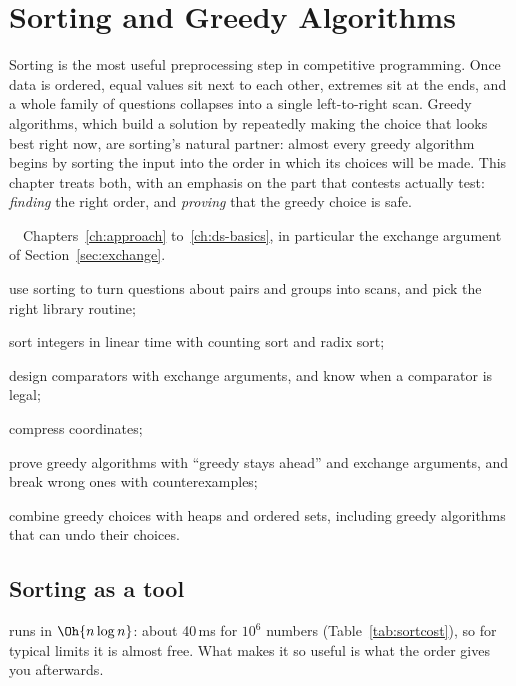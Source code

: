 \chapter{Sorting and Greedy Algorithms}\label{ch:sorting}

Sorting is the most useful preprocessing step in competitive programming. Once data is ordered, equal values sit next to
each other, extremes sit at the ends, and a whole family of questions collapses into a single left-to-right scan. Greedy
algorithms, which build a solution by repeatedly making the choice that looks best right now, are sorting's natural partner:
almost every greedy algorithm begins by sorting the input into the order in which its choices will be made. This chapter
treats both, with an emphasis on the part that contests actually test: \emph{finding} the right order, and \emph{proving}
that the greedy choice is safe.

\begin{chapterintro}{\bronze\ \silver\ \gold}{Chapters~\ref{ch:approach} to~\ref{ch:ds-basics}, in particular the exchange
argument of Section~\ref{sec:exchange}.}
  \item use sorting to turn questions about pairs and groups into scans, and pick the right library routine;
  \item sort integers in linear time with counting sort and radix sort;
  \item design comparators with exchange arguments, and know when a comparator is legal;
  \item compress coordinates;
  \item prove greedy algorithms with ``greedy stays ahead'' and exchange arguments, and break wrong ones with
        counterexamples;
  \item combine greedy choices with heaps and ordered sets, including greedy algorithms that can undo their choices.
\end{chapterintro}

\section[Sorting as a tool]{Sorting as a tool \hfill \bronze}\label{sec:sorting-tool}

 runs in $\Oh{n\log n}$: about 40\,ms for $10^6$ numbers (Table~\ref{tab:sortcost}), so for typical limits it is
almost free. What makes it so useful is what the order gives you afterwards.

